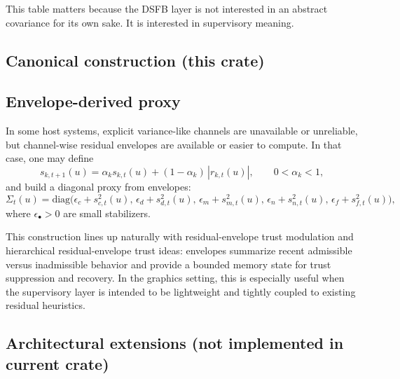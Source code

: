\documentclass[11pt,letterpaper]{article}
\theoremstyle{gcresult}
\theoremstyle{definition}
\begin{document}
This table matters because the DSFB layer is not interested in an abstract covariance for its own sake. It is interested in supervisory meaning.


\subsection*{Canonical construction (this crate)}


\subsection{Envelope-derived proxy}

In some host systems, explicit variance-like channels are unavailable or unreliable, but channel-wise residual envelopes are available or easier to compute. In that case, one may define
\begin{equation}
s_{k,t+1}(u)=\alpha_k s_{k,t}(u)+(1-\alpha_k)\,|r_{k,t}(u)|,
\qquad 0<\alpha_k<1,
\end{equation}
and build a diagonal proxy from envelopes:
\begin{equation}
\Sigma_t(u)=\mathrm{diag}\!\bigl(
\epsilon_c + s^{2}_{c,t}(u),\,
\epsilon_d + s^{2}_{d,t}(u),\,
\epsilon_m + s^{2}_{m,t}(u),\,
\epsilon_n + s^{2}_{n,t}(u),\,
\epsilon_f + s^{2}_{f,t}(u)
\bigr),
\end{equation}
where $\epsilon_\bullet>0$ are small stabilizers.

This construction lines up naturally with residual-envelope trust modulation and hierarchical residual-envelope trust ideas: envelopes summarize recent admissible versus inadmissible behavior and provide a bounded memory state for trust suppression and recovery. In the graphics setting, this is especially useful when the supervisory layer is intended to be lightweight and tightly coupled to existing residual heuristics.


\subsection*{Architectural extensions (not implemented in current crate)}
\end{document}
